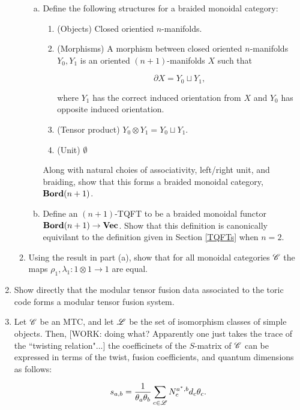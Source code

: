 \documentclass{article}
\theoremstyle{definition}
\numberwithin{figure}{section}
\begin{document}
\begin{enumerate}[\thesection .1.]
\begin{enumerate}[\thesection .1.]
\begin{enumerate}[(a)]
\item Define the following structures for a braided monoidal category:

\begin{enumerate}
\item  (Objects) Closed orientied $n$-manifolds.

\item (Morphisms) A morphism between closed oriented $n$-manifolds $Y_0,Y_1$ is an oriented $(n+1)$-manifolds $X$ such that

$$\partial X = Y_0\sqcup Y_1,$$

where $Y_1$ has the correct induced orientation from $X$ and $Y_0$ has opposite induced orientation. 

\item (Tensor product) $Y_0\otimes Y_1 = Y_0\sqcup Y_1$.

\item (Unit) $\emptyset$
\end{enumerate}

Along with natural choies of associativity, left/right unit, and braiding, show that this forms a braided monoidal category, $\bold{Bord}(n+1)$.

\item Define an $(n+1)$-TQFT to be a braided monoidal functor $\bold{Bord}(n+1)\to \bold{Vec}$. Show that this definition is canonically equivilant to the definition given in Section \ref{TQFTs} when $n=2$.
\end{enumerate}

\item Using the result in part (a), show that for all monoidal categories $\mathscr{C}$ the maps $\rho_1,\lambda_1:1\otimes 1\to 1$ are equal.

\end{enumerate}

\item Show directly that the modular tensor fusion data associated to the toric code forms a modular tensor fusion system.

\item  Let $\mathscr{C}$ be an MTC, and let $\mathscr{L}$ be the set of isomorphism classes of simple objects. Then, [WORK: doing what? Apparently one just takes the trace of the ``twisting relation"...] the coefficinets of the $S$-matrix of $\mathscr{C}$ can be expressed in terms of the twist, fusion coefficients, and quantum dimensions as follows:

$$s_{a,b}=\frac{1}{\theta_a \theta_b}\sum_{c\in \mathscr{L}}N^{a^*,b}_{c}d_{c}\theta_{c}.$$


\end{enumerate}
\end{document}
